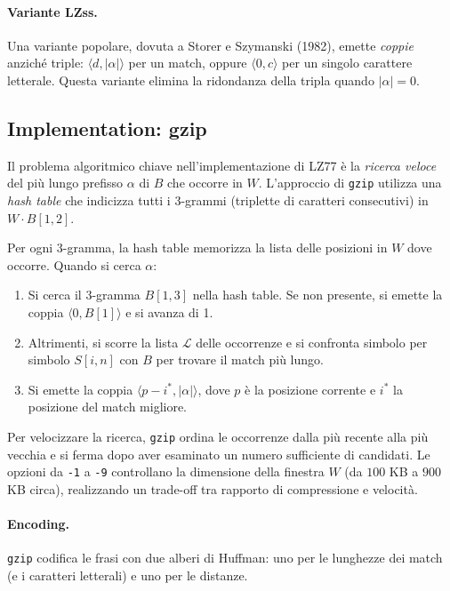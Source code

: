 \documentclass[12pt, a4paper, oneside]{book}
\theoremstyle{plain}
\theoremstyle{definition}
\theoremstyle{remark}
\begin{document}
\paragraph{Variante LZss.}
Una variante popolare, dovuta a Storer e Szymanski (1982), emette \emph{coppie} anziché triple: $\langle d, |\alpha| \rangle$ per un match, oppure $\langle 0, c \rangle$ per un singolo carattere letterale. Questa variante elimina la ridondanza della tripla quando $|\alpha| = 0$.

\subsection{Implementation: gzip}

Il problema algoritmico chiave nell'implementazione di LZ77 è la \emph{ricerca veloce} del più lungo prefisso $\alpha$ di $B$ che occorre in $W$. L'approccio di \texttt{gzip} utilizza una \emph{hash table} che indicizza tutti i 3-grammi (triplette di caratteri consecutivi) in $W \cdot B[1,2]$.

Per ogni 3-gramma, la hash table memorizza la lista delle posizioni in $W$ dove occorre. Quando si cerca $\alpha$:
\begin{enumerate}
  \item Si cerca il 3-gramma $B[1,3]$ nella hash table. Se non presente, si emette la coppia $\langle 0, B[1] \rangle$ e si avanza di 1.
  \item Altrimenti, si scorre la lista $\mathcal{L}$ delle occorrenze e si confronta simbolo per simbolo $S[i, n]$ con $B$ per trovare il match più lungo.
  \item Si emette la coppia $\langle p - i^*, |\alpha| \rangle$, dove $p$ è la posizione corrente e $i^*$ la posizione del match migliore.
\end{enumerate}

Per velocizzare la ricerca, \texttt{gzip} ordina le occorrenze dalla più recente alla più vecchia e si ferma dopo aver esaminato un numero sufficiente di candidati. Le opzioni da \texttt{-1} a \texttt{-9} controllano la dimensione della finestra $W$ (da $100$ KB a $900$ KB circa), realizzando un trade-off tra rapporto di compressione e velocità.

\paragraph{Encoding.}
\texttt{gzip} codifica le frasi con due alberi di Huffman: uno per le lunghezze dei match (e i caratteri letterali) e uno per le distanze.
\end{document}
